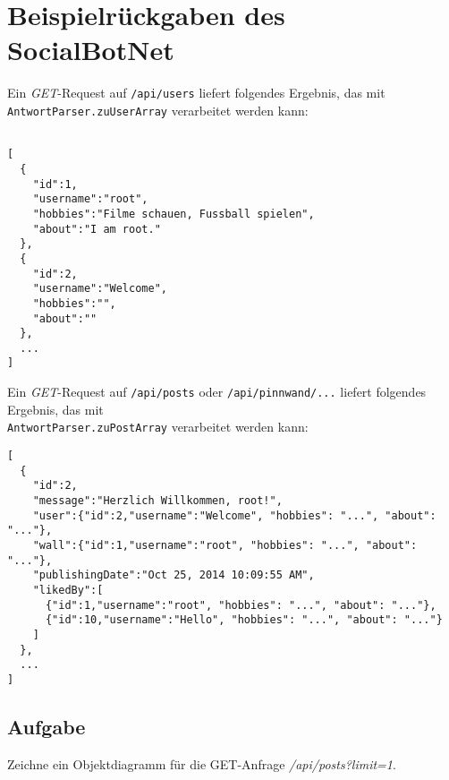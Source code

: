 \documentclass[parskip=half*]{scrartcl}
\begin{document}
\newpage
\section*{Beispielrückgaben des SocialBotNet}

Ein \emph{GET}-Request auf \lstinline{/api/users} liefert folgendes Ergebnis, das mit \lstinline{AntwortParser.zuUserArray} verarbeitet werden kann:
\begin{lstlisting}

[
  {
    "id":1,
    "username":"root",
    "hobbies":"Filme schauen, Fussball spielen",
    "about":"I am root."
  },
  {
    "id":2,
    "username":"Welcome",
    "hobbies":"",
    "about":""
  },
  ...
]
\end{lstlisting}


Ein \emph{GET}-Request auf \lstinline{/api/posts} oder \lstinline{/api/pinnwand/...} liefert folgendes Ergebnis, das mit \\\lstinline{AntwortParser.zuPostArray} verarbeitet werden kann:
\begin{lstlisting}
[
  {
    "id":2,
    "message":"Herzlich Willkommen, root!",
    "user":{"id":2,"username":"Welcome", "hobbies": "...", "about": "..."},
    "wall":{"id":1,"username":"root", "hobbies": "...", "about": "..."},
    "publishingDate":"Oct 25, 2014 10:09:55 AM",
    "likedBy":[
      {"id":1,"username":"root", "hobbies": "...", "about": "..."},
      {"id":10,"username":"Hello", "hobbies": "...", "about": "..."}
    ]
  },
  ...
]
\end{lstlisting}

\subsection*{Aufgabe} Zeichne ein Objektdiagramm für die GET-Anfrage \emph{/api/posts?limit=1}.
\end{document}
